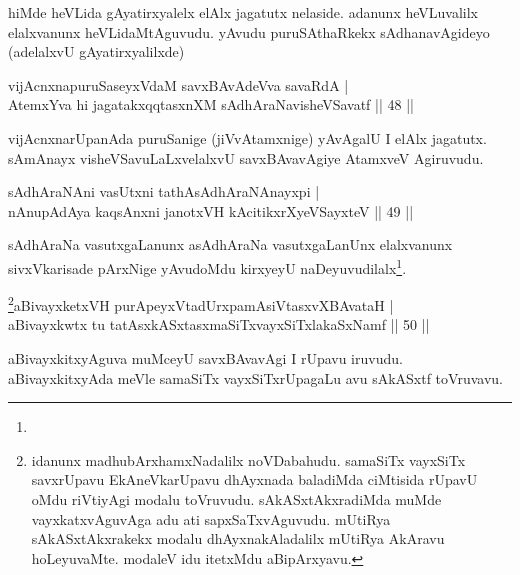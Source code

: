 \begin{artha} 
hiMde heVLida gAyatirxyalelx elAlx jagatutx nelaside. adanunx 
heVLuvalilx elalxvanunx heVLidaMtAguvudu. yAvudu puruSAthaRkekx 
sAdhanavAgideyo (adelalxvU gAyatirxyalilxde)
\end{artha}


\begin{shl}
vijAcnxnapuruSaseyxVdaM savxBAvAdeVva savaRdA | \\
AtemxYva hi jagatakxqqtasxnXM sAdhAraNavisheVSavatf \hfill ||  48 ||
\end{shl}

\begin{artha} 
vijAcnxnarUpanAda puruSanige (jiVvAtamxnige) yAvAgalU I elAlx 
jagatutx. sAmAnayx visheVSavuLaLxvelalxvU savxBAvavAgiye AtamxveV 
Agiruvudu.
\end{artha}


\begin{shl}
sAdhAraNAni vasUtxni tathA\s sAdhAraNAnayxpi | \\
nAnupAdAya kaqsAnxni janotxVH kAcitikxrXyeVSayxteV \hfill ||  49 || 
\end{shl}

\begin{artha} 
sAdhAraNa vasutxgaLanunx asAdhAraNa vasutxgaLanUnx elalxvanunx 
sivxVkarisade pArxNige yAvudoMdu kirxyeyU naDeyuvudilalx\footnote{}.
\end{artha}



\begin{shl}
\footnote{idanunx madhubArxhamxNadalilx noVDabahudu. samaSiTx 
vayxSiTx savxrUpavu EkAneVkarUpavu dhAyxnada baladiMda ciMtisida 
rUpavU oMdu riVtiyAgi modalu toVruvudu. sAkASxtAkxradiMda muMde 
vayxkatxvAguvAga adu ati sapxSaTxvAguvudu. mUtiRya sAkASxtAkxrakekx 
modalu dhAyxnakAladalilx mUtiRya AkAravu hoLeyuvaMte. modaleV idu 
itetxMdu aBipArxyavu.}aBivayxketxVH purA\s peyxVtadUrxpamAsiVtasxvXBAvataH | \\
aBivayxkwtx tu tatAsxkASxtasxmaSiTxvayxSiTxlakaSxNamf \hfill ||  50 || 
\end{shl}

\begin{artha} 
aBivayxkitxyAguva muMceyU savxBAvavAgi I rUpavu iruvudu. 
aBivayxkitxyAda meVle samaSiTx vayxSiTxrUpagaLu avu sAkASxtf 
toVruvavu.
\end{artha}

